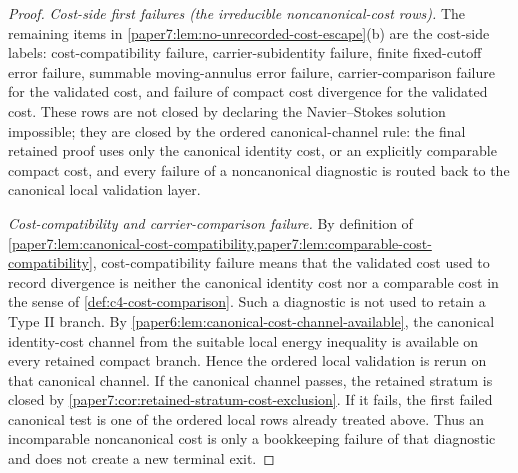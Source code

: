 \documentclass[11pt]{amsart}
\theoremstyle{plain}
\theoremstyle{definition}
\theoremstyle{remark}
\begin{document}
\begin{proof}
\smallskip\noindent\emph{Cost-side first failures (the irreducible
noncanonical-cost rows).}  The remaining items in
\cref{paper7:lem:no-unrecorded-cost-escape}\textup{(b)} are the cost-side
labels: cost-compatibility failure, carrier-subidentity failure, finite
fixed-cutoff error failure, summable moving-annulus error failure,
carrier-comparison failure for the validated cost, and failure of compact
cost divergence for the validated cost.  These rows are not closed by declaring
the Navier--Stokes solution impossible; they are closed by the ordered
canonical-channel rule: the final retained proof uses only the canonical
identity cost, or an explicitly comparable compact cost, and every failure of a
noncanonical diagnostic is routed back to the canonical local validation layer.

\emph{Cost-compatibility and carrier-comparison failure.}  By definition of
\cref{paper7:lem:canonical-cost-compatibility,paper7:lem:comparable-cost-compatibility},
cost-compatibility failure means that the validated cost used to record
divergence is neither the canonical identity cost nor a comparable cost in
the sense of \cref{def:c4-cost-comparison}.  Such a diagnostic is not used to
retain a Type II branch.  By
\cref{paper6:lem:canonical-cost-channel-available}, the canonical identity-cost
channel from the suitable local energy inequality is available on every
retained compact branch.  Hence the ordered local validation is rerun on that
canonical channel.  If the canonical channel passes, the retained stratum is closed by
\cref{paper7:cor:retained-stratum-cost-exclusion}.  If it fails, the first
failed canonical test is one of the ordered local rows already treated above.
Thus an incomparable noncanonical cost is only a bookkeeping failure of that
diagnostic and does not create a new terminal exit.


\end{proof}
\end{document}
